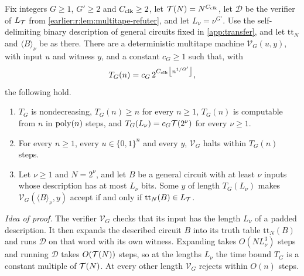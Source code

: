 \begin{lemma}\label{earlier:r:lem:succinct-verifier}\label{earlier:g:lem:succinct-verifier}
Fix integers \(G\ge1\), \(G'\ge2\) and \(C_{\rm clk}\ge2\), let
\(\mathcal T(N)=N^{C_{\rm clk}}\), let \(\mathcal D\) be the verifier of
\(L_{\mathcal T}\) from \cref{earlier:r:lem:multitape-refuter}, and let
\(L_\nu=\nu^{G'}\). Use the self-delimiting binary description of
general circuits fixed in \cref{app:transfer}, and let
\(\mathrm{tt}_N\) and \(\langle B\rangle_\nu\) be as there. There are a deterministic multitape machine
\(\mathcal V_G(u,y)\), with input \(u\) and witness \(y\), and a constant
\(c_G\ge1\) such that, with
\[
 T_G(n)=c_G\,2^{C_{\rm clk}\left\lfloor n^{1/G'}\right\rfloor},
\]
the following hold.
\begin{enumerate}[label=(\roman*)]
\item \(T_G\) is nondecreasing, \(T_G(n)\ge n\) for every \(n\ge1\),
\(T_G(n)\) is computable from \(n\) in \(\operatorname{poly}(n)\) steps, and
\(T_G(L_\nu)=c_G\mathcal T(2^\nu)\) for every \(\nu\ge1\).
\item For every \(n\ge1\), every \(u\in\{0,1\}^n\) and every \(y\),
\(\mathcal V_G\) halts within \(T_G(n)\) steps.
\item Let \(\nu\ge1\) and \(N=2^\nu\), and let \(B\) be a general circuit
with at least \(\nu\) inputs whose description has at most \(L_\nu\)
bits. Some \(y\) of length \(T_G(L_\nu)\) makes
\(\mathcal V_G(\langle B\rangle_\nu,y)\) accept if and only if
\(\mathrm{tt}_N(B)\in L_{\mathcal T}\).
\end{enumerate}
\end{lemma}

\emph{Idea of proof.} The verifier \(\mathcal V_G\) checks that its
input has the length \(L_\nu\) of a padded description. It then expands
the described circuit \(B\) into its truth table \(\mathrm{tt}_N(B)\)
and runs \(\mathcal D\) on that word with its own witness. Expanding
takes \(O(NL_\nu^3)\) steps and running \(\mathcal D\) takes
\(O(\mathcal T(N))\) steps, so at the lengths \(L_\nu\) the time bound
\(T_G\) is a constant multiple of \(\mathcal T(N)\). At every other length
\(\mathcal V_G\) rejects within \(O(n)\) steps.

